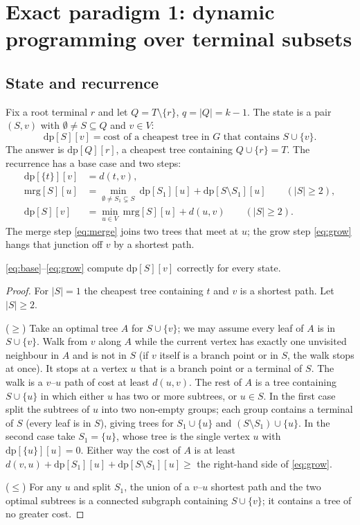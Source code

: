 \section{Exact paradigm 1: dynamic programming over terminal subsets}\label{sec:dp}

\subsection{State and recurrence}
Fix a root terminal \(r\) and let \(Q=T\setminus\{r\}\), \(q=|Q|=k-1\). The state is a pair \((S,v)\) with
\(\emptyset\neq S\subseteq Q\) and \(v\in V\):
\[\mathrm{dp}[S][v]=\text{cost of a cheapest tree in }G\text{ that contains }S\cup\{v\}.\]
The answer is \(\mathrm{dp}[Q][r]\), a cheapest tree containing \(Q\cup\{r\}=T\). The recurrence has a base case and two
steps:
\begin{align}
\mathrm{dp}[\{t\}][v]&=d(t,v), \label{eq:base}\\
\mathrm{mrg}[S][u]&=\min_{\emptyset\neq S_1\subsetneq S}\ \mathrm{dp}[S_1][u]+\mathrm{dp}[S\setminus S_1][u] \qquad(|S|\ge2), \label{eq:merge}\\
\mathrm{dp}[S][v]&=\min_{u\in V}\ \mathrm{mrg}[S][u]+d(u,v) \qquad(|S|\ge2). \label{eq:grow}
\end{align}
The merge step \eqref{eq:merge} joins two trees that meet at \(u\); the grow step \eqref{eq:grow} hangs that junction off
\(v\) by a shortest path.

\begin{lemma}\label{lem:dw}
\eqref{eq:base}--\eqref{eq:grow} compute \(\mathrm{dp}[S][v]\) correctly for every state.
\end{lemma}
\begin{proof}
For \(|S|=1\) the cheapest tree containing \(t\) and \(v\) is a shortest path. Let \(|S|\ge2\).

(\(\ge\)) Take an optimal tree \(A\) for \(S\cup\{v\}\); we may assume every leaf of \(A\) is in \(S\cup\{v\}\). Walk from
\(v\) along \(A\) while the current vertex has exactly one unvisited neighbour in \(A\) and is not in \(S\) (if \(v\) itself is a
branch point or in \(S\), the walk stops at once). It stops at a vertex \(u\) that is a branch point or a terminal of \(S\). The walk
is a \(v\)--\(u\) path of cost at least \(d(u,v)\). The rest of \(A\) is a tree containing \(S\cup\{u\}\) in which either \(u\) has
two or more subtrees, or \(u\in S\). In the first case split the subtrees of \(u\) into two non-empty groups; each group contains a
terminal of \(S\) (every leaf is in \(S\)), giving trees for \(S_1\cup\{u\}\) and \((S\setminus S_1)\cup\{u\}\). In the second
case take \(S_1=\{u\}\), whose tree is the single vertex \(u\) with \(\mathrm{dp}[\{u\}][u]=0\). Either way the cost of \(A\) is at least
\(d(v,u)+\mathrm{dp}[S_1][u]+\mathrm{dp}[S\setminus S_1][u]\ge\) the right-hand side of \eqref{eq:grow}.

(\(\le\)) For any \(u\) and split \(S_1\), the union of a \(v\)--\(u\) shortest path and the two optimal subtrees is a connected
subgraph containing \(S\cup\{v\}\); it contains a tree of no greater cost.
\end{proof}

